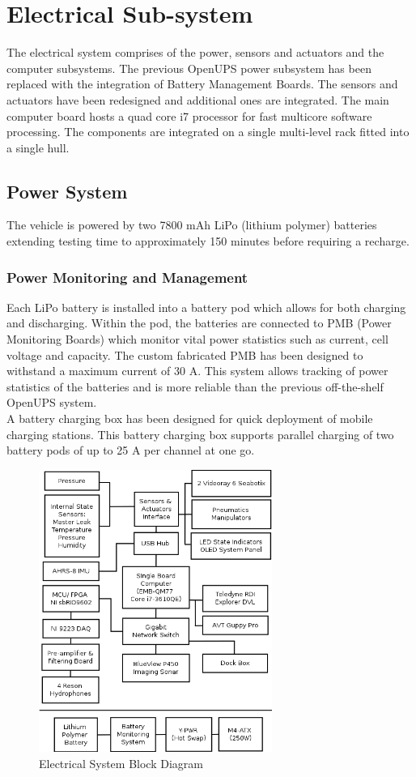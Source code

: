 \documentclass[journal,12pt]{IEEEtran}
\begin{document}
\section{Electrical Sub-system}
The electrical system comprises of the power, sensors and actuators and the computer subsystems. The previous OpenUPS power subsystem has been replaced with the integration of Battery Management Boards. The sensors and actuators have been redesigned and additional ones are integrated. The main computer board hosts a quad core i7 processor for fast multicore software processing. The components are integrated on a single multi-level rack fitted into a single hull. 

\subsection{Power System}
The vehicle is powered by two 7800 mAh LiPo (lithium polymer) batteries extending testing time to approximately 150 minutes before requiring a recharge. \\

\subsubsection{Power Monitoring and Management}
Each LiPo battery is installed into a battery pod which allows for both charging and discharging. Within the pod, the batteries are connected to PMB (Power Monitoring Boards) which monitor vital power statistics such as current, cell voltage and capacity. The custom fabricated PMB has been designed to withstand a maximum current of 30 A. This system allows tracking of power statistics of the batteries and is more reliable than the previous off-the-shelf OpenUPS system. \\

A battery charging box has been designed for quick deployment of mobile charging stations. This battery charging box supports parallel charging of two battery pods of up to 25 A per channel at one go. \\

\begin{figure}[h]
\centering
\includegraphics[width=3in]{diagram.png}
\caption{Electrical System Block Diagram}
\captionsetup{justification=centering}
\end{figure}
\end{document}
